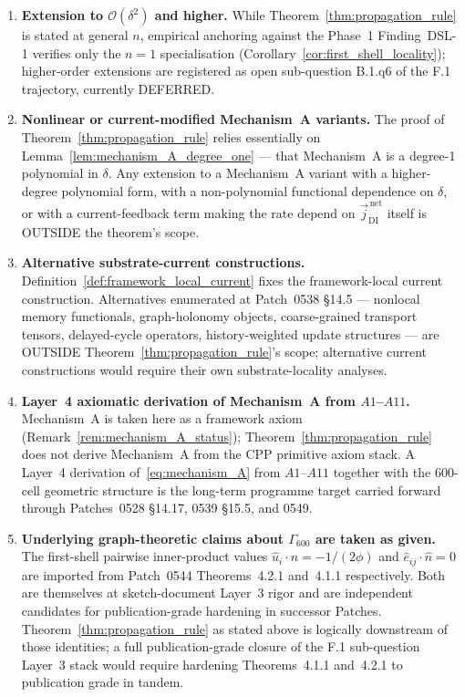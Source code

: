 \documentclass[11pt,letterpaper]{article}
\newcommand{\nhat}{\hat{n}}
\newcommand{\jDInet}{\vec{j}_{\text{DI}}^{\,\text{net}}}
\newcommand{\Eorder}[1]{\mathcal{O}(\delta^{#1})}
\newcommand{\Gsixcell}{\Gamma_{600}}
\begin{document}
\begin{enumerate}[label=\textbf{(E\arabic*)}]
\item \textbf{Extension to $\Eorder{2}$ and higher.} While Theorem~\ref{thm:propagation_rule} is stated at general $n$, empirical anchoring against the Phase~1 Finding~DSL-1 verifies only the $n=1$ specialisation (Corollary~\ref{cor:first_shell_locality}); higher-order extensions are registered as open sub-question B.1.q6 of the F.1 trajectory, currently DEFERRED.
\item \textbf{Nonlinear or current-modified Mechanism~A variants.} The proof of Theorem~\ref{thm:propagation_rule} relies essentially on Lemma~\ref{lem:mechanism_A_degree_one} --- that Mechanism~A is a degree-1 polynomial in $\delta$. Any extension to a Mechanism~A variant with a higher-degree polynomial form, with a non-polynomial functional dependence on $\delta$, or with a current-feedback term making the rate depend on $\jDInet$ itself is OUTSIDE the theorem's scope.
\item \textbf{Alternative substrate-current constructions.} Definition~\ref{def:framework_local_current} fixes the framework-local current construction. Alternatives enumerated at Patch~0538 \S14.5 --- nonlocal memory functionals, graph-holonomy objects, coarse-grained transport tensors, delayed-cycle operators, history-weighted update structures --- are OUTSIDE Theorem~\ref{thm:propagation_rule}'s scope; alternative current constructions would require their own substrate-locality analyses.
\item \textbf{Layer~4 axiomatic derivation of Mechanism~A from $A1$--$A11$.} Mechanism~A is taken here as a framework axiom (Remark~\ref{rem:mechanism_A_status}); Theorem~\ref{thm:propagation_rule} does not derive Mechanism~A from the CPP primitive axiom stack. A Layer~4 derivation of~\eqref{eq:mechanism_A} from $A1$--$A11$ together with the 600-cell geometric structure is the long-term programme target carried forward through Patches~0528 \S14.17, 0539 \S15.5, and 0549.
\item \textbf{Underlying graph-theoretic claims about $\Gsixcell$ are taken as given.} The first-shell pairwise inner-product values $\hat{u}_i\cdot\nhat = -1/(2\phi)$ and $\hat{e}_{ij}\cdot\nhat = 0$ are imported from Patch~0544 Theorems~4.2.1 and~4.1.1 respectively. Both are themselves at sketch-document Layer~3 rigor and are independent candidates for publication-grade hardening in successor Patches. Theorem~\ref{thm:propagation_rule} as stated above is logically downstream of those identities; a full publication-grade closure of the F.1 sub-question Layer~3 stack would require hardening Theorems~4.1.1 and~4.2.1 to publication grade in tandem.
\end{enumerate}
\end{document}
